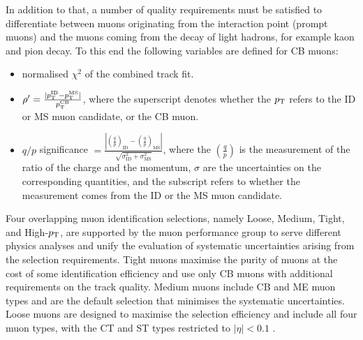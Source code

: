 In addition to that, a number of quality requirements must be
satisfied to differentiate between muons originating from the
interaction point (prompt muons) and the muons coming from the
decay of light hadrons, for example kaon and pion decay.
To this end the following variables are
defined for CB muons:
\begin{itemize}
\item normalised $\chi^2$ of the combined track fit.
\item $\rho' = \frac{|p_{\text{T}}^{\text{ID}} - p_{\text{T}}^{\text{MS}}|}{p_{\text{T}}^{\text{CB}}}$,
where the superscript denotes whether the $p_{\text{T}}$ refers to the
ID or MS muon candidate, or the CB muon.
\item $q/p$ significance $ = \frac{\left|\left(\frac{q}{p}\right)_\text{ID}
- \left(\frac{q}{p}\right)_\text{MS}\right|}
{\sqrt{\sigma^2_\text{ID} + \sigma^2_\text{MS}}}$,
where the $\left(\frac{q}{p}\right)$ is the measurement of the ratio of
the charge and the momentum, $\sigma$ are the uncertainties on
the corresponding quantities, and the subscript refers to whether
the measurement comes from the ID or the MS muon candidate.
\end{itemize}

Four overlapping muon identification selections, namely Loose, Medium, Tight,
and High-$p_{\text{T}}$, are supported by the muon performance group to 
serve different physics analyses and unify the evaluation of
systematic uncertainties arising from the selection requirements.
Tight muons maximise the purity of muons at the cost of some
identification efficiency and use only CB muons with additional
requirements on the track quality. Medium muons include CB and ME
muon types and are the default selection that minimises the systematic
uncertainties. Loose muons are designed to maximise the selection
efficiency and include all four muon types, with the CT and ST types
restricted to $|\eta| < 0.1$ \cite{Aad:2016jkr}.

